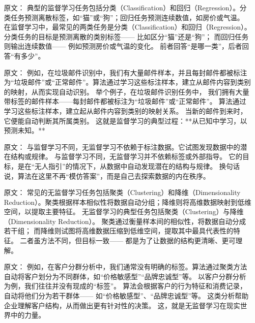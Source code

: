 原文：
典型的监督学习任务包括分类（Classification）和回归（Regression）。分类任务预测离散标签，如“猫”或“狗”；回归任务预测连续数值，如房价或气温。
在监督学习中，最常见的两类任务是分类（Classification）和回归（Regression）。  
分类任务的目标是预测离散的类别标签——  
比如区分“猫”还是“狗”；  
而回归任务则输出连续数值——  
例如预测房价或气温的变化。  
前者回答“是哪一类”，后者回答“有多少”。



原文：
例如，在垃圾邮件识别中，我们有大量邮件样本，并且每封邮件都被标注为“垃圾邮件”或“正常邮件”。算法通过学习这些标注样本，建立从邮件内容到类别的映射，从而实现自动识别。
举个例子，在垃圾邮件识别任务中，  
我们拥有大量带标签的邮件样本——每封邮件都被标注为“垃圾邮件”或“正常邮件”。  
算法通过学习这些标注样本，建立起从邮件内容到类别的映射关系。  
当新的邮件到来时，它便能自动判断其所属类别。  
这就是监督学习的典型过程：**从已知中学习，以预测未知。**



原文：
与监督学习不同，无监督学习不依赖于标注数据。它试图发现数据中的潜在结构或规律。
与监督学习不同，无监督学习并不依赖标签或外部指导。  
它的目标，是在“无人指引”的情况下，从数据中自动发现潜在的结构与规律。  
换句话说，算法在这里不再“模仿答案”，而是自己去探索数据的内在秩序。



原文：
常见的无监督学习任务包括聚类（Clustering）和降维（Dimensionality Reduction）。聚类根据样本相似性将数据自动分组；降维则将高维数据映射到低维空间，以提取主要特征。
无监督学习的典型任务包括聚类（Clustering）与降维（Dimensionality Reduction）。  
聚类通过衡量样本间的相似性，将数据自动分成若干组；  
而降维则试图将高维数据压缩到低维空间，提取其中最具代表性的特征。  
二者虽方法不同，但目标一致——  
都是为了让数据的结构更清晰、更可理解。



原文：
例如，在客户分群分析中，我们通常没有明确的标签。算法通过聚类方法自动将客户划分为不同群体，如“价格敏感型”“品牌忠诚型”等。
以客户分群分析为例，我们往往并没有现成的“标签”。  
算法会根据客户的行为特征和消费记录，自动将他们分为若干群体——  
如“价格敏感型”、“品牌忠诚型”等。  
这类分析帮助企业理解客户结构，从而做出更有针对性的决策。  
这，就是无监督学习在现实世界中的力量。



